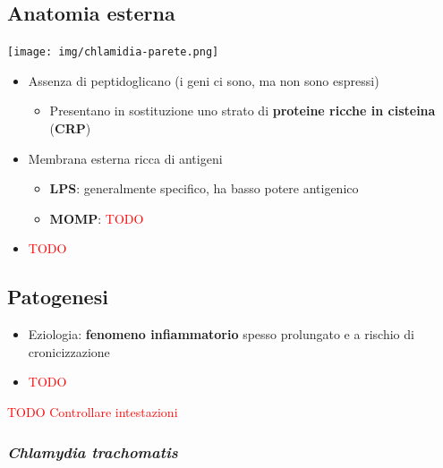 \documentclass[italian,]{article}
\providecommand{\tightlist}{%
  \setlength{\itemsep}{0pt}\setlength{\parskip}{0pt}}
\newcommand{\TODO}[1]{\textcolor{red}{\textsf{\footnotesize{TODO #1}}}} %
\begin{document}
\hypertarget{anatomia-esterna}{%
\subsection{Anatomia esterna}\label{anatomia-esterna}}

\texttt{[image: img/chlamidia-parete.png]}~

\begin{itemize}
\item
  Assenza di peptidoglicano (i geni ci sono, ma non sono espressi)

  \begin{itemize}
  \tightlist
  \item
    Presentano in sostituzione uno strato di \textbf{proteine ricche in
    cisteina} (\textbf{CRP})
  \end{itemize}
\item
  Membrana esterna ricca di antigeni

  \begin{itemize}
  \tightlist
  \item
    \textbf{LPS}: generalmente specifico, ha basso potere antigenico
  \item
    \textbf{MOMP}: \TODO{}
  \end{itemize}
\item
  \TODO{}
\end{itemize}

\hypertarget{patogenesi}{%
\subsection{Patogenesi}\label{patogenesi}}

\begin{itemize}
\item
  Eziologia: \textbf{fenomeno infiammatorio} spesso prolungato e a
  rischio di cronicizzazione
\item
  \TODO{}
\end{itemize}

\TODO{Controllare intestazioni}

\hypertarget{chlamydia-trachomatis}{%
\subsubsection{\texorpdfstring{\emph{Chlamydia
trachomatis}}{Chlamydia trachomatis}}\label{chlamydia-trachomatis}}
\end{document}
